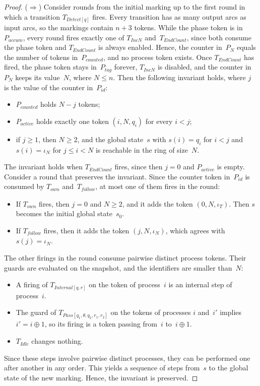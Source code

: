 \documentclass[11pt]{article}
\theoremstyle{definition}
\begin{document}
\begin{proof}
  ($\Rightarrow$) Consider rounds from the initial marking up to the first
  round in which a transition $T_{\mathit{Detect}[q]}$ fires. Every
  transition has as many output arcs as input arcs, so the markings contain
  $n + 3$ tokens. While the phase token is in~$P_{\mathit{accum}}$, every
  round fires exactly one of $T_{\mathit{IncN}}$ and~$T_{\mathit{EndCount}}$,
  since both consume the phase token and $T_{\mathit{EndCount}}$ is always
  enabled. Hence, the counter in~$P_N$ equals the number of tokens in~$P_{\mathit{counted}}$,
  and no process token exists. Once $T_{\mathit{EndCount}}$ has fired, the
  phase token stays in~$P_{\mathit{tag}}$ forever, $T_{\mathit{IncN}}$ is
  disabled, and the counter in~$P_N$ keeps its value~$N$, where $N \le n$.
  Then the following invariant holds, where $j$ is the value of the counter
  in~$P_{\mathit{id}}$:
  \begin{itemize}
    \item $P_{\mathit{counted}}$ holds $N - j$ tokens;
    \item $P_{\mathit{active}}$ holds exactly one token $(i, N, q_i)$ for
      every $i < j$;
    \item if $j \ge 1$, then $N \ge 2$, and the global state~$s$ with
      $s(i) = q_i$ for $i < j$ and $s(i) = \iota_N$ for $j \le i < N$ is
      reachable in the ring of size~$N$.
  \end{itemize}
  The invariant holds when $T_{\mathit{EndCount}}$ fires, since then $j = 0$
  and $P_{\mathit{active}}$ is empty. Consider a round that preserves the
  invariant. Since the counter token in~$P_{\mathit{id}}$ is consumed by
  $T_{\mathit{own}}$ and~$T_{\mathit{follow}}$, at most one of them fires in
  the round:
  \begin{itemize}
    \item If $T_{\mathit{own}}$ fires, then $j = 0$ and $N \ge 2$, and it
      adds the token $(0, N, \iota_T)$. Then $s$ becomes the initial global
      state~$s_0$.
    \item If $T_{\mathit{follow}}$ fires, then it adds the token
      $(j, N, \iota_N)$, which agrees with $s(j) = \iota_N$.
  \end{itemize}
  The other firings in the round consume pairwise distinct process tokens.
  Their guards are evaluated on the snapshot, and the identifiers are
  smaller than~$N$:
  \begin{itemize}
    \item A firing of $T_{\mathit{Internal}[q, r]}$ on the token of
      process~$i$ is an internal step of process~$i$.
    \item The guard of $T_{\mathit{Pass}[q_1, \theta, q_2, r_1, r_2]}$ on the
      tokens of processes $i$ and~$i'$ implies $i' = i \oplus 1$, so its
      firing is a token passing from~$i$ to~$i \oplus 1$.
    \item $T_{\mathit{Idle}}$ changes nothing.
  \end{itemize}
  Since these steps involve pairwise distinct processes, they can be
  performed one after another in any order. This yields a sequence of steps
  from~$s$ to the global state of the new marking. Hence, the invariant is
  preserved.


\end{proof}
\end{document}
